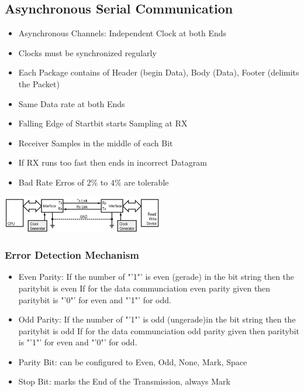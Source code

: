 \clearpage
\pagebreak
\subsection{Asynchronous Serial Communication }
\begin{minipage}{12cm}
	\begin{itemize}
		\item Asynchronous Channels: Independent Clock at both Ends	
		\item Clocks must be synchronized regularly
		\item Each Package contains of Header (begin Data), Body (Data), Footer (delimits the Packet)
		\item Same Data rate at both Ends
		\item Falling Edge of Startbit starts Sampling at RX
		\item Receiver Samples in the middle of each Bit
		\item If RX runs too fast then ends in incorrect Datagram
		\item Bad Rate Erros of $2\%$ to $4\%$ are tolerable
	\end{itemize}
\end{minipage}
\begin{minipage}{7cm}
	\includegraphics[width=7cm]{images/asyn.png}
\end{minipage}

\subsubsection{Error Detection Mechanism}
\begin{itemize}
	\item Even Parity: If the number of "'1"' is even (gerade) in the bit string then the paritybit is even \newline If for the data communciation even parity given then paritybit is "'0"' for even and "'1"' for odd. 
	\item Odd Parity: If the number of "'1"' is odd (ungerade)in the bit string then the paritybit is odd \newline If for the data communciation odd parity given then paritybit is "'1"' for even and "'0"' for odd.
	\item Parity Bit: can be configured to Even, Odd, None, Mark, Space
	\item Stop Bit: marks the End of the Transmission, always Mark
\end{itemize}
